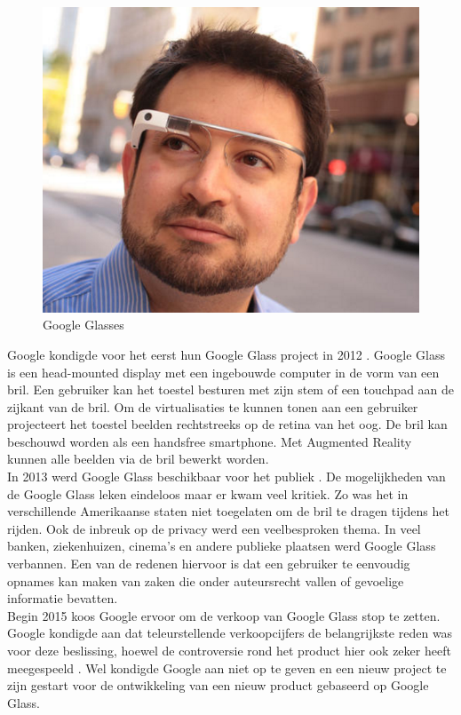 \documentclass[pdftex,a4paper,12pt,twoside]{report}
\begin{document}
\begin{figure}

\includegraphics[scale=0.25]{googleAan.png}
\caption{Google Glasses \citep{ggFotoAan}} 
\end{figure}

Google kondigde voor het eerst hun Google Glass project in 2012 \citep{ggannounce}. Google Glass is een head-mounted display met een ingebouwde computer in de vorm van een bril. Een gebruiker kan het toestel besturen met zijn stem of een touchpad aan de zijkant van de bril. Om de virtualisaties te kunnen tonen aan een gebruiker projecteert het toestel beelden rechtstreeks op de retina van het oog. De bril kan beschouwd worden als een handsfree smartphone. Met Augmented Reality kunnen alle beelden via de bril bewerkt worden.\\

In 2013 werd Google Glass beschikbaar voor het publiek \citep{ggHistory}. De mogelijkheden van de Google Glass leken eindeloos maar er kwam veel kritiek. Zo was het in verschillende Amerikaanse staten niet toegelaten om de bril te dragen tijdens het rijden. Ook de inbreuk op de privacy werd een veelbesproken thema. In veel banken, ziekenhuizen, cinema's en andere publieke plaatsen werd Google Glass verbannen. Een van de redenen hiervoor is dat een gebruiker te eenvoudig opnames kan maken van zaken die onder auteursrecht vallen of gevoelige informatie bevatten. \\

Begin 2015 koos Google ervoor om de verkoop van Google Glass stop te zetten. Google kondigde aan dat teleurstellende verkoopcijfers de belangrijkste reden was voor deze beslissing, hoewel de controversie rond het product hier ook zeker heeft meegespeeld \citep{ggFail}. Wel kondigde Google aan niet op te geven en een nieuw project te zijn gestart voor de ontwikkeling van een nieuw product gebaseerd op Google Glass.\\
\end{document}
